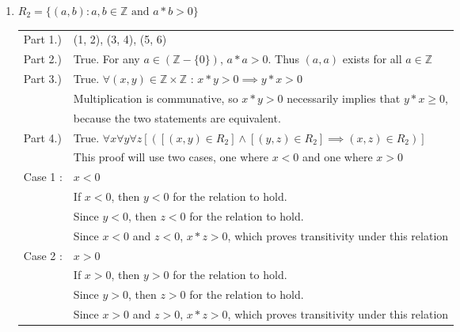 \documentclass[a4paper,11pt]{article}
\begin{document}
\begin{enumerate}
\begin{enumerate}
    \item $R_2 = \{(a,b) : a,b \in \mathbb{Z} \text{ and } a*b > 0 \}$ \\[.1in]
        \begin{tabular}{l  l}
        Part 1.) & (1, 2), (3, 4), (5, 6) \\
        Part 2.) & True. For any $a \in (\mathbb{Z} - \{0\})$, $ a*a > 0$. Thus $(a, a)$ exists for all $a \in \mathbb{Z}$\\
        Part 3.) & True. $\forall (x,y) \in \mathbb{Z} \times \mathbb{Z}$ : $x*y > 0 \implies y*x > 0$ \\
                 &  Multiplication is communative, so $x*y > 0$ necessarily implies that $y*x \geq 0$, \\
                 &  because the two statements are equivalent. \\
        Part 4.) & True. $\forall x \forall y \forall z [([(x,y) \in R_2] \wedge [(y,z) \in R_2] \implies (x, z) \in R_2) ]$ \\
                 &   This proof will use two cases, one where $x < 0$ and one where $x > 0$ \\
        Case 1 : & $x < 0$ \\
                 & If $x < 0$, then $y < 0$ for the relation to hold. \\
                 & Since $y < 0$, then $z < 0$ for the relation to hold. \\
                 & Since $x < 0$ and $z < 0$, $x*z > 0$, which proves transitivity under this relation \\
        Case 2 : & $x > 0$ \\
                 & If $x > 0$, then $y > 0$ for the relation to hold. \\
                 & Since $y > 0$, then $z > 0$ for the relation to hold. \\
                 & Since $x > 0$ and $z > 0$, $x*z > 0$, which proves transitivity under this relation \\
        \end{tabular}


\end{enumerate}
\end{enumerate}
\end{document}

